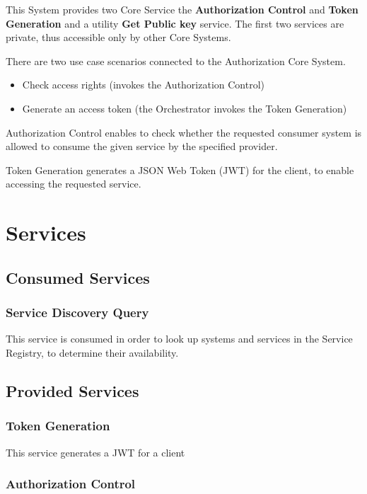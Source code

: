 \documentclass[a4paper]{arrowhead}
\newcommand{\scdef}[2]{{\textcolor{ArrowheadBlue}{#2\label{sec:services:consumed:#1}}}}
\newcommand{\spdef}[2]{{\textcolor{ArrowheadBlue}{#2\label{sec:services:produced:#1}}}}
\begin{document}
This System provides two Core Service the \textbf{Authorization Control} and \textbf{Token Generation}  and a utility \textbf{Get Public key} service. The first two services are private, thus accessible only by other Core Systems.


There are two use case scenarios connected to the Authorization Core System.
\begin{itemize}
    \item Check access rights (invokes the Authorization Control)
    \item Generate an access token (the Orchestrator invokes the Token Generation)
\end{itemize}

Authorization Control enables to check whether the requested consumer system is allowed to consume the given service by the specified provider.

Token Generation generates a JSON Web Token (JWT) for the client, to enable accessing the requested service.

\section{Services}
\label{sec:services}


\subsection{Consumed Services}

\subsubsection{\scdef{ServiceDiscoveryQuery}{Service Discovery Query}}

This service is consumed in order to look up systems and services in the Service Registry, to determine their availability.

\subsection{Provided Services}

\subsubsection{\spdef{TokenGeneration}{Token Generation}}

This service generates a JWT for a client

\subsubsection{\spdef{AuthorizationControl}{Authorization Control}}
\end{document}
